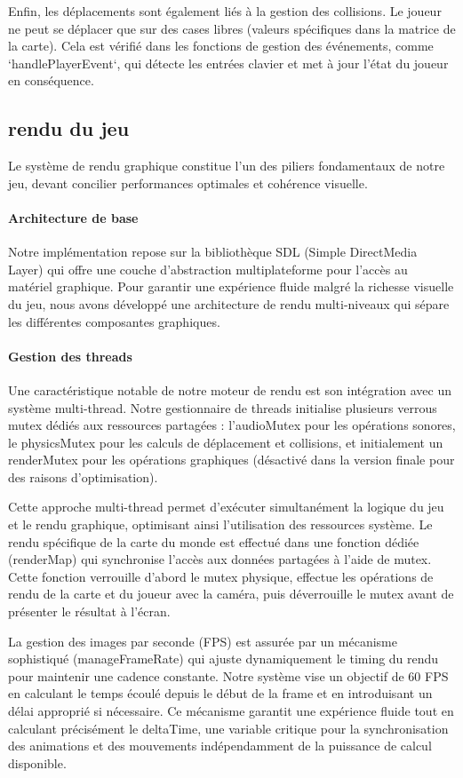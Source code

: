 \documentclass[12pt,a4paper, twoside]{article}
\begin{document}
    Enfin, les déplacements sont également liés à la gestion des collisions. Le joueur ne peut se déplacer que sur des cases libres (valeurs spécifiques dans la matrice de la carte). Cela est vérifié dans les fonctions de gestion des événements, comme `handlePlayerEvent`, qui détecte les entrées clavier et met à jour l'état du joueur en conséquence.

\subsection{rendu du jeu}
Le système de rendu graphique constitue l'un des piliers fondamentaux de notre jeu, devant concilier performances optimales et cohérence visuelle.

\paragraph{Architecture de base} Notre implémentation repose sur la bibliothèque SDL (Simple DirectMedia Layer) qui offre une couche d'abstraction multiplateforme pour l'accès au matériel graphique. Pour garantir une expérience fluide malgré la richesse visuelle du jeu, nous avons développé une architecture de rendu multi-niveaux qui sépare les différentes composantes graphiques.

\paragraph{Gestion des threads} Une caractéristique notable de notre moteur de rendu est son intégration avec un système multi-thread. Notre gestionnaire de threads initialise plusieurs verrous mutex dédiés aux ressources partagées : l'audioMutex pour les opérations sonores, le physicsMutex pour les calculs de déplacement et collisions, et initialement un renderMutex pour les opérations graphiques (désactivé dans la version finale pour des raisons d'optimisation).

Cette approche multi-thread permet d'exécuter simultanément la logique du jeu et le rendu graphique, optimisant ainsi l'utilisation des ressources système. Le rendu spécifique de la carte du monde est effectué dans une fonction dédiée (renderMap) qui synchronise l'accès aux données partagées à l'aide de mutex. Cette fonction verrouille d'abord le mutex physique, effectue les opérations de rendu de la carte et du joueur avec la caméra, puis déverrouille le mutex avant de présenter le résultat à l'écran.

La gestion des images par seconde (FPS) est assurée par un mécanisme sophistiqué (manageFrameRate) qui ajuste dynamiquement le timing du rendu pour maintenir une cadence constante. Notre système vise un objectif de 60 FPS en calculant le temps écoulé depuis le début de la frame et en introduisant un délai approprié si nécessaire. Ce mécanisme garantit une expérience fluide tout en calculant précisément le deltaTime, une variable critique pour la synchronisation des animations et des mouvements indépendamment de la puissance de calcul disponible.
\end{document}
